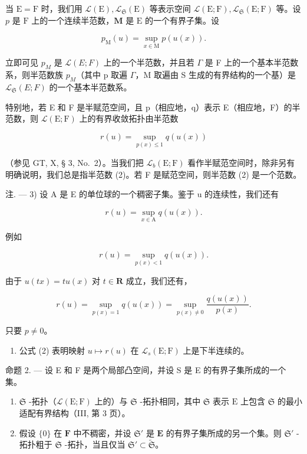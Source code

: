 当 \(\mathrm{E} = \mathrm{F}\) 时，我们用 \(\mathcal{L}(\mathrm{E}), \mathcal{L}_{\mathfrak{S}}(\mathrm{E})\) 等表示空间 \(\mathcal{L}(\mathrm{E};\mathrm{F}), \mathcal{L}_{\mathfrak{S}}(\mathrm{E};\mathrm{F})\) 等。设 \(p\) 是 \(\mathrm{F}\) 上的一个连续半范数，\(\mathbf{M}\) 是 \(\mathrm{E}\) 的一个有界子集。设

\[
p _ {\mathrm{M}} (u) = \sup _ {x \in \mathrm{M}} p (u (x)).\tag{1}
\]

立即可见 \(p_{M}\) 是 \(\mathcal{L}(E;F)\) 上的一个半范数，并且若 \(\Gamma\) 是 F 上的一个基本半范数系，则半范数族 \(p_{M}\)（其中 p 取遍 \(\Gamma\)，M 取遍由 S 生成的有界结构的一个基）是 \(\mathcal{L}_{\mathfrak{S}}(E;F)\) 的一个基本半范数系。

特别地，若 E 和 F 是半赋范空间，且 p（相应地，q）表示 E（相应地，F）的半范数，则 \(\mathcal{L}(\mathrm{E};\mathrm{F})\) 上的有界收敛拓扑由半范数

\[
r (u) = \sup _ {p (x) \leqslant 1} q (u (x))\tag{2}
\]

（参见 GT, X, § 3, No.~2）。当我们把 \(\mathcal{L}_b(\mathrm{E};\mathrm{F})\) 看作半赋范空间时，除非另有明确说明，我们总是指半范数 (2)。若 F 是赋范空间，则半范数 (2) 是一个范数。

注. --- 3) 设 A 是 E 的单位球的一个稠密子集。鉴于 u 的连续性，我们还有

\[
r (u) = \sup _ {x \in \mathrm{A}} q (u (x)).\tag{3}
\]

例如

\[
r (u) = \sup _ {p (x) <   1} q (u (x)).\tag{4}
\]

由于 \(u(tx) = tu(x)\) 对 \(t \in \mathbf{R}\) 成立，我们还有，

\[
r (u) = \sup _ {p (x) = 1} q (u (x)) = \sup _ {p (x) \neq 0} \frac {q (u (x))}{p (x)}.\tag{5}
\]

只要 \(p \neq 0\)。

\begin{enumerate}
\def\labelenumi{\arabic{enumi})}
\setcounter{enumi}{3}
\tightlist
\item
  公式 (2) 表明映射 \(u \mapsto r(u)\) 在 \(\mathcal{L}_s(\mathrm{E};\mathrm{F})\) 上是下半连续的。
\end{enumerate}

命题 2. --- 设 E 和 F 是两个局部凸空间，并设 S 是 E 的有界子集所成的一个集。

\begin{enumerate}
\def\labelenumi{\arabic{enumi})}
\item
  \(\mathfrak{S}\) -拓扑（\(\mathcal{L}(\mathrm{E};\mathrm{F})\) 上的）与 \(\mathfrak{S}\) -拓扑相同，其中 \(\mathfrak{S}\) 表示 \(\mathrm{E}\) 上包含 \(\mathfrak{S}\) 的最小适配有界结构（III, 第 3 页）。
\item
  假设 \(\{0\}\) 在 \(\mathbf{F}\) 中不稠密，并设 \(\mathfrak{S}'\) 是 \(\mathbf{E}\) 的有界子集所成的另一个集。则 \(\mathfrak{S}'\) -拓扑粗于 \(\mathfrak{S}\) -拓扑，当且仅当 \(\mathfrak{S}' \subset \tilde{\mathfrak{S}}\)。
\end{enumerate}

